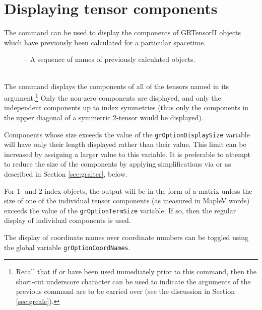\documentclass{article}
\begin{document}
\section{Displaying tensor components} \label{sec:grdisplay}
%
The command  can be used to display the components
of GRTensorII objects which have previously been calculated for a
particular spacetime.\\
%
\begin{cmdspec}
  \label{spec:grdisplay}

  \begin{description}
    \item[] -- A sequence of names of previously calculated
      objects.
  \end{description}

\end{cmdspec}\\

The  command displays the components of all of the
tensors named in its argument.\footnote{Recall that if 
or  have been used immediately prior to this command,
then the short-cut underscore character can be used to indicate the
arguments of the previous command are to be carried over (see the
discussion in Section \ref{sec:grcalc}).}  Only the non-zero
components are displayed, and only the independent components up to
index symmetries (thus only the components in the upper diagonal of a
symmetric 2-tensor would be displayed).

Components whose size exceeds the value of the
\texttt{grOptionDisplaySize} variable will have only their length displayed
rather than their value. This limit can be increased by assigning a larger
value to this variable. It is preferable to attempt to reduce the size of
the components by applying simplifications via  or 
 as described in Section \ref{sec:gralter}, below.

For 1- and 2-index objects, the output will be in the form of a matrix
unless the size of one of the individual tensor components (as measured in
MapleV words) exceeds the value of the \texttt{grOptionTermSize} variable.
If so, then the regular display of individual components is used.

The display of coordinate names over coordinate numbers can be toggled
using the global variable \texttt{grOptionCoordNames}.\\
\end{document}
